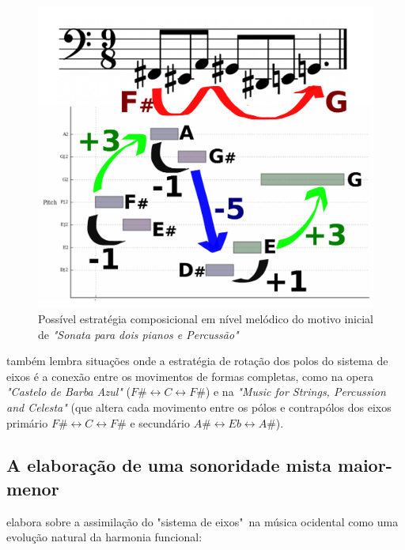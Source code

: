 \documentclass[
	12pt,				%
	openright,			%
	twoside,			%
	a4paper,			%
	english,			%
	french,				%
	spanish,			%
	brazil				%
	]{abntex2}
\begin{document}
\begin{figure}[!h]
	\caption{\label{fig_grafico}Possível estratégia composicional em nível melódico do motivo inicial de \textit{"Sonata para dois pianos e Percussão"}}
	\begin{center}
	    \includegraphics[scale=0.4]{axis/temasonata2P.pdf}
	\end{center}
\end{figure}

 também lembra situações onde a estratégia de rotação dos polos do sistema de eixos é a conexão entre os movimentos de formas completas, como na opera \textit{"Castelo de Barba Azul"} ($F\# \leftrightarrow  C \leftrightarrow F\#$) e na \textit{"Music for Strings, Percussion and Celesta" } (que altera cada movimento entre os pólos e contrapólos dos eixos primário $F\# \leftrightarrow  C \leftrightarrow F\#$ e secundário $A\# \leftrightarrow  Eb \leftrightarrow A\#$).


\subsection{A elaboração de uma sonoridade mista maior-menor}
\label{lendvai_maior_menor}



 elabora sobre a assimilação do "sistema de eixos"\ na música ocidental como uma evolução natural da harmonia funcional:  
\end{document}
